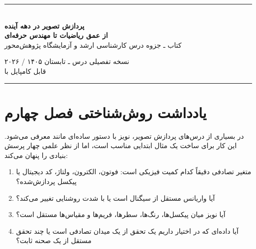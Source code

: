 \documentclass[12pt,openany,oneside]{book}
\begin{document}
\begin{titlepage}
\centering
\vspace*{0.9cm}
{\color{DeepBlue}\rule{0.9\textwidth}{1.1pt}}\\[1.0cm]
{\Huge\bfseries پردازش تصویر در دهه آینده\\[0.3cm]}
{\LARGE\bfseries از عمق ریاضیات تا مهندس حرفه‌ای\\[0.85cm]}
{\Large کتاب ـ جزوه درس کارشناسی ارشد و آزمایشگاه پژوهش‌محور\\[1.1cm]}


\vfill
{\large نسخه تفصیلی درس ـ تابستان ۱۴۰۵ / ۲۰۲۶}\\[0.4cm]
{\normalsize قابل کامپایل با }\\[0.8cm]
{\color{DeepBlue}\rule{0.9\textwidth}{1.1pt}}
\end{titlepage}

\frontmatter

\chapter*{یادداشت روش‌شناختی فصل چهارم}

در بسیاری از درس‌های پردازش تصویر، نویز با دستور ساده‌ای مانند
 معرفی می‌شود. این کار برای ساخت یک مثال ابتدایی مناسب است،
اما از نظر علمی چهار پرسش بنیادی را پنهان می‌کند:
\begin{enumerate}
\item متغیر تصادفی دقیقاً کدام کمیت فیزیکی است: فوتون، الکترون، ولتاژ، کد دیجیتال یا پیکسل پردازش‌شده؟
\item آیا واریانس مستقل از سیگنال است یا با شدت روشنایی تغییر می‌کند؟
\item آیا نویز میان پیکسل‌ها، رنگ‌ها، سطرها، فریم‌ها و مقیاس‌ها مستقل است؟
\item آیا داده‌ای که در اختیار داریم یک تحقق از یک میدان تصادفی است یا چند تحقق مستقل از یک صحنه ثابت؟
\end{enumerate}
\end{document}
